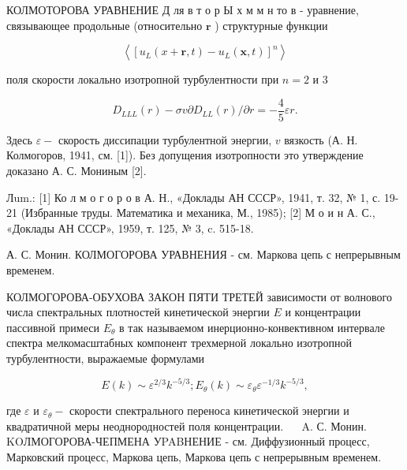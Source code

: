 \documentclass[10pt]{article}
\begin{document}
КОЛМОТОРОВА УРАВНЕНИЕ Д ля в т о р Ы х м м н то в - уравнение, связывающее продольные (относительно $\boldsymbol{r}$ ) структурные функции



\[

\left\langle\left[u_{L}(x+\boldsymbol{r}, t)-u_{L}(\boldsymbol{x}, t)\right]^{n}\right\rangle

\]



поля скорости локально изотропной турбулентности при $n=2$ и 3



\[

D_{L L L}(r)-\sigma v \partial D_{L L}(r) / \partial r=-\frac{4}{5} \varepsilon r .

\]



Здесь $\varepsilon-$ скорость диссипации турбулентной энергии, $v$ вязкость (А. Н. Колмогоров, 1941, см. [1]). Без допущения изотропности это утверждение доказано А. С. Мониным [2].



Лum.: [1] Ко л м о г о р о в А. Н., «Доклады АН СССР», 1941, т. 32, № 1, с. 19-21 (Избранные труды. Математика и механика, М., 1985); [2] М о и н А. С., «Доклады АН СССР», 1959, т. 125, № 3, c. 515-18.

А. С. Монин. КОЛМОГОРОВА УРАВНЕНИЯ - см. Маркова цепь с непрерывным временем.



КОЛМОГОРОВА-ОБУХОВА ЗАКОН ПЯТИ ТРЕТЕЙ зависимости от волнового числа спектральных плотностей кинетической энергии $E$ и концентрации пассивной примеси $E_{\theta}$ в так называемом инерционно-конвективном интервале спектра мелкомасштабных компонент трехмерной локально изотропной турбулентности, выражаемые формулами



\[

E(k) \sim \varepsilon^{2 / 3} k^{-5 / 3} ; E_{\theta}(k) \sim \varepsilon_{\theta} \varepsilon^{-1 / 3} k^{-5 / 3},

\]



где $\varepsilon$ и $\varepsilon_{\theta}-$ скорости спектрального переноса кинетической энергии и квадратичной меры неоднородностей поля концентрации. $\quad$ A. С. Монин. KOЛМОГОРОВА-ЧЕПМЕНА УPABНЕНИЕ - см. Диффузионный процесс, Марковский процесс, Маркова цепь, Маркова цепь с непрерывным временем.
\end{document}
